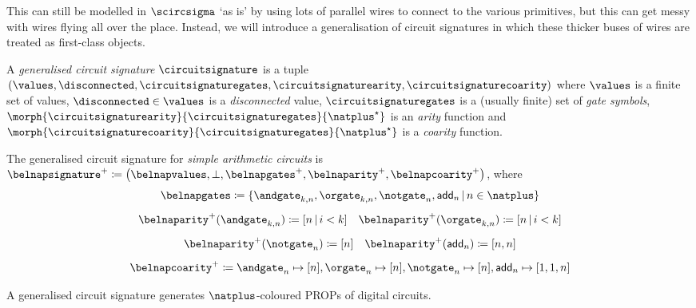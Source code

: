 This can still be modelled in \(\scircsigma\) `as is' by using lots of parallel
wires to connect to the various primitives, but this can get messy with wires
flying all over the place.
Instead, we will introduce a generalisation of circuit signatures in which these
thicker buses of wires are treated as first-class objects.

\begin{definition}
    A \emph{generalised circuit signature} \(\circuitsignature\) is a tuple \((
    \values,
    \disconnected,
    \circuitsignaturegates,
    \circuitsignaturearity,
    \circuitsignaturecoarity
    )\) where \(\values\) is a finite set of values, \(
    \disconnected \in \values
    \) is a \emph{disconnected} value, \(\circuitsignaturegates\) is a (usually
    finite) set of \emph{gate symbols}, \(
    \morph{\circuitsignaturearity}{\circuitsignaturegates}{\natplus^\star}
    \) is an \emph{arity} function and \(
    \morph{\circuitsignaturecoarity}{\circuitsignaturegates}{\natplus^\star}
    \) is a \emph{coarity} function.
\end{definition}

\begin{example}
    The generalised circuit signature for \emph{simple arithmetic circuits} is
    \(
    \belnapsignature^+ \coloneqq \left(
    \belnapvalues,
    \bot,
    \belnapgates^+,
    \belnaparity^+,
    \belnapcoarity^+
    \right)
    \), where \begin{gather*}
        \belnapgates
        \coloneqq \{
        \andgate_{k,n},
        \orgate_{k,n},
        \notgate_{n},
        \mathsf{add}_n
        \,|\,
        n \in \natplus
        \}
        \\[0.5em]
        \belnaparity^+(\andgate_{k,n}) \coloneqq [n \,|\, i < k]
        \quad
        \belnaparity^+(\orgate_{k,n}) \coloneqq [n \,|\, i < k]
        \\[0.5em]
        \belnaparity^+(\notgate_{n}) \coloneqq [n]
        \quad
        \belnaparity^+(\mathsf{add}_n) \coloneqq [n,n]
        \\[0.5em]
        \belnapcoarity^+
        \coloneqq
        \andgate_n \mapsto [n],
        \orgate_n \mapsto [n],
        \notgate_n \mapsto [n],
        \mathsf{add}_n \mapsto [1,1,n]
    \end{gather*}
\end{example}

A generalised circuit signature generates \(\natplus\)-coloured PROPs of digital
circuits.

